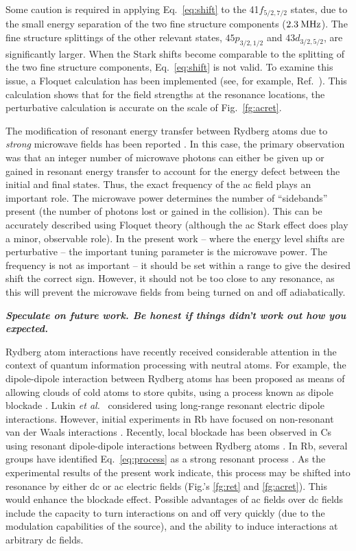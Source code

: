 \documentclass[letterpaper,twocolumn,showpacs,preprintnumbers,amsmath,amssymb,prl,nolongbibliography]{revtex4-2}
\begin{document}
Some caution is required in applying
Eq.~\ref{eq:shift} to the 41$f_{5/2,7/2}$ states, due to the
small energy separation of the two fine structure components
($2.3 \: {\rm MHz}$).  The fine structure
splittings of the other relevant states, $45p_{3/2,1/2}$ and
$43d_{3/2,5/2}$, are significantly larger.
When the Stark shifts become comparable
to the splitting of the two fine structure
components, Eq.~\ref{eq:shift}
is not valid.
To examine this issue, a Floquet calculation
has been implemented (see, for example, Ref.~\cite{water:1990}).
This calculation shows that
for the field strengths at the resonance
locations, the perturbative calculation is accurate on the scale
of Fig.~\ref{fg:acret}.

The modification of resonant energy transfer between Rydberg atoms due
to {\em strong} microwave fields has been
reported \cite{kachru:1982,pillet:1983}.
In this case, the primary observation was
that an integer number of microwave photons can either
be given up or gained in resonant energy transfer to account for
the energy defect between the initial and final states.
Thus, the exact frequency of the ac field
plays an important role.  The microwave power determines the number
of ``sidebands'' present (the number of photons lost or gained
in the collision).  This can be accurately described using
Floquet theory \cite{pillet:1983} (although the ac Stark effect
does play a minor, observable role).
In the present work -- where the energy level
shifts are perturbative -- the important tuning parameter is
the microwave power.  The frequency is not as important -- it
should be set within
a range to give the desired shift the correct sign.
However,
it should not be too close to any resonance, as this will prevent
the microwave fields from being turned on and off adiabatically.

\textbf{\emph{Speculate on future work.  Be honest if things didn't work out how you expected.}}

Rydberg atom interactions have recently received considerable attention
in the context of quantum information processing with neutral
atoms.  For example, the dipole-dipole interaction between Rydberg atoms
has been proposed as means of
allowing clouds of cold atoms to store qubits, using a process
known as dipole blockade \cite{lukin:2001}.
Lukin {\it et al.}~\cite{lukin:2001}
considered using long-range resonant electric dipole interactions.
However, initial experiments in Rb have focused on non-resonant
van der Waals interactions \cite{tong:2004,singer:2004,liebisch:2005}.
Recently, local blockade has been observed in Cs using
resonant dipole-dipole interactions between
Rydberg atoms \cite{vogt:2006}.
In Rb, several groups have  identified Eq.~\ref{eq:process}
as a strong resonant process \cite{walker:2005}.
As the experimental results of the present work indicate,
this process may be
shifted into resonance by either dc or ac electric fields
(Fig.'s \ref{fg:ret} and \ref{fg:acret}).  This would enhance
the blockade effect.  Possible advantages of ac fields over
dc fields include the capacity to
turn interactions on and off very quickly (due to the modulation
capabilities of the source), and the ability to induce
interactions at arbitrary dc fields.
\end{document}
